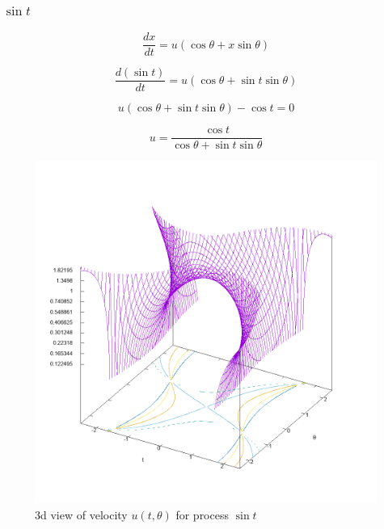 \documentclass{article}
\begin{document}
\subsubsection{$\sin t$}

\begin{equation}
    \frac{dx}{dt} = u (\cos \theta + x \sin \theta)
\end{equation}

\begin{equation}
    \frac{d(\sin t)}{dt} = u(\cos \theta + \sin t \sin \theta)
\end{equation}

\begin{equation}
    u(\cos \theta + \sin t \sin \theta) - \cos t = 0
\end{equation}

\begin{equation}
    u = \frac{\cos t}{\cos \theta + \sin t \sin \theta}
\end{equation}


\begin{figure}[ht]
\centering
\includegraphics[width=5.5in]{plot/sine3d.png}
\caption{3d view of velocity $u(t, \theta)$ for process $\sin t$}
\end{figure}
\end{document}
